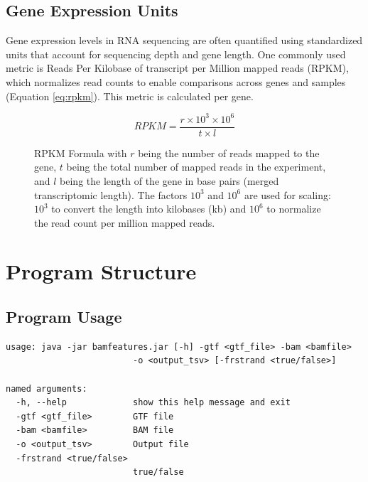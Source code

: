 \documentclass{article}
\begin{document}
    \subsection{Gene Expression Units}
    Gene expression levels in RNA sequencing are often quantified using standardized units that account for sequencing depth and gene length. One commonly used metric is Reads Per Kilobase of transcript per Million mapped reads (RPKM), which normalizes read counts to enable comparisons across genes and samples (Equation \ref{eq:rpkm})\cite{bedre_2021}. This metric is calculated per gene.
    \begin{figure}[h]
        \centering
        \begin{equation}
            RPKM = \frac{r \times 10^3 \times 10^6}{t \times l}
            \label{eq:rpkm}
        \end{equation}
        \caption{RPKM Formula with $r$ being the number of reads mapped to the gene, $t$ being the total number of mapped reads in the experiment, and $l$ being the length of the gene in base pairs (merged transcriptomic length). The factors $10^3$ and $10^6$ are used for scaling: $10^3$ to convert the length into kilobases (kb) and $10^6$ to normalize the read count per million mapped reads.}
    \end{figure}


    \section{Program Structure}

    \subsection{Program Usage}
    \begin{verbatim}
usage: java -jar bamfeatures.jar [-h] -gtf <gtf_file> -bam <bamfile>
                         -o <output_tsv> [-frstrand <true/false>]

named arguments:
  -h, --help             show this help message and exit
  -gtf <gtf_file>        GTF file
  -bam <bamfile>         BAM file
  -o <output_tsv>        Output file
  -frstrand <true/false>
                         true/false
    \end{verbatim}
\end{document}
